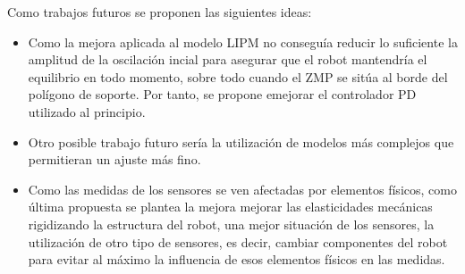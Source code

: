 Como trabajos futuros se proponen las siguientes ideas:

\begin{itemize}

\item Como la mejora aplicada al modelo LIPM no conseguía reducir lo suficiente la amplitud de la oscilación incial para asegurar que el robot mantendría el equilibrio en todo momento, sobre todo cuando el ZMP se sitúa al borde del polígono de soporte. Por tanto, se propone emejorar el controlador PD utilizado al principio.

\newpage

\item Otro posible trabajo futuro sería la utilización de modelos más complejos que permitieran un ajuste más fino.

\item Como las medidas de los sensores se ven afectadas por elementos físicos, como última propuesta se plantea la mejora mejorar las elasticidades mecánicas rigidizando la estructura del robot, una mejor situación de los sensores, la utilización de otro tipo de sensores, es decir, cambiar componentes del robot para evitar al máximo la influencia de esos elementos físicos en las medidas.

\end{itemize}
 


\afterpage{\null\newpage}
\newpage